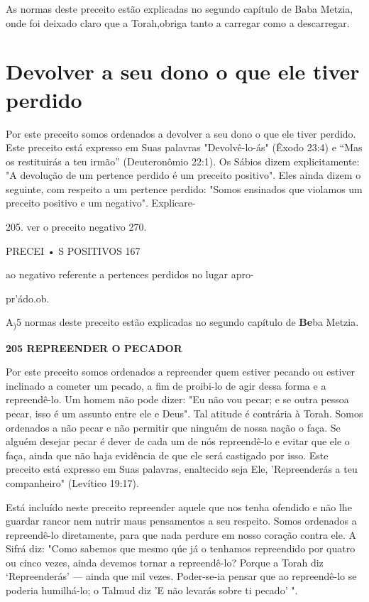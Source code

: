 As normas deste preceito estão explicadas no segundo capítulo de Baba
Metzia, onde foi deixado claro que a Torah,obriga tanto a carregar como
a descarregar.

\section{Devolver a seu dono o que ele tiver perdido}

Por este preceito somos ordenados a devolver a seu dono o que ele tiver
perdido. Este preceito está expresso em Suas palavras "Devolvê-lo-ás"
(Êxo­do 23:4) e ``Mas os restituirás a teu irmão'' (Deuteronômio 22:1). Os
Sábios di­zem explicitamente: "A devolução de um pertence perdido é um
preceito po­sitivo". Eles ainda dizem o seguinte, com respeito a um
pertence perdido: "So­mos ensinados que violamos um preceito positivo e
um negativo". Explicare-

205. ver o preceito negativo 270.

PRECEI • S POSITIVOS 167


ao negativo referente a pertences perdidos no lugar apro-


pr'ádo.ob.

A\textsubscript{)}5 normas deste preceito estão explicadas no segundo
capítulo de \textbf{Be}ba Metzia.

\textbf{205 REPREENDER O PECADOR}

Por este preceito somos ordenados a repreender quem estiver pe­cando ou
estiver inclinado a cometer um pecado, a fim de proibi-lo de agir des­sa
forma e a repreendê-lo. Um homem não pode dizer: "Eu não vou pecar; e se
outra pessoa pecar, isso é um assunto entre ele e Deus". Tal atitude é
contrá­ria à Torah. Somos ordenados a não pecar e não permitir que
ninguém de nos­sa nação o faça. Se alguém desejar pecar é dever de cada
um de nós repreendê-lo e evitar que ele o faça, ainda que não haja
evidência de que ele será castigado por isso. Este preceito está
expresso em Suas palavras, enaltecido seja Ele, 'Re­preenderás a teu
companheiro" (Levítico 19:17).

Está incluído neste preceito repreender aquele que nos tenha ofen­dido e
não lhe guardar rancor nem nutrir maus pensamentos a seu respeito. Somos
ordenados a repreendê-lo diretamente, para que nada perdure em nos­so
coração contra ele. A Sifrá diz: "Como sabemos que mesmo qúe já o
tenha­mos repreendido por quatro ou cinco vezes, ainda devemos tornar a
repreendê-lo? Porque a Torah diz `Repreenderás' --- ainda que mil vezes.
Poder-se-ia pen­sar que ao repreendê-lo se poderia humilhá-lo; o Talmud
diz 'E não levarás so­bre ti pecado' ".

